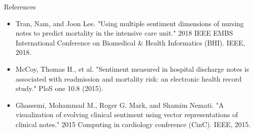 \documentclass[11pt]{beamer}
\begin{document}
\begin{frame}{References}
	\begin{itemize}
		\item Tran, Nam, and Joon Lee. "Using multiple sentiment dimensions of nursing notes to predict mortality in the intensive care unit." 2018 IEEE EMBS International Conference on Biomedical \& Health Informatics (BHI). IEEE, 2018.
		\item McCoy, Thomas H., et al. "Sentiment measured in hospital discharge notes is associated with readmission and mortality risk: an electronic health record study." PloS one 10.8 (2015).
		\item Ghassemi, Mohammad M., Roger G. Mark, and Shamim Nemati. "A visualization of evolving clinical sentiment using vector representations of clinical notes." 2015 Computing in cardiology conference (CinC). IEEE, 2015.
		
	\end{itemize}
\end{frame}
\end{document}
